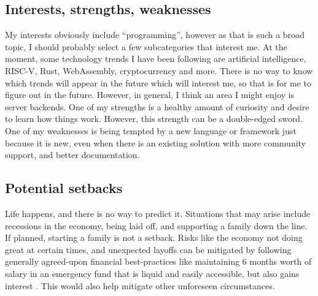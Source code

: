 \subsection{Interests, strengths, weaknesses}
My interests obviously include ``programming'', however as that is such a broad
topic, I should probably select a few subcategories that interest me.  At the
moment, some technology trends I have been following are artificial
intelligence, RISC-V, Rust, WebAssembly, cryptocurrency and more.  There is no
way to know which trends will appear in the future which will interest me, so
that is for me to figure out in the future. However, in general, I think an area
I might enjoy is server backends.  One of my strengths is a healthy amount of
curiosity and desire to learn how things work. However, this strength can be a
double-edged sword. One of my weaknesses is being tempted by a new language or
framework just because it is new, even when there is an existing solution with
more community support, and better documentation. 

\subsection{Potential setbacks}
Life happens, and there is no way to predict it. Situations that may arise
include recessions in the economy, being laid off, and supporting a family down
the line. If planned, starting a family is not a setback.
Risks like the economy not doing great at certain times, and
unexpected layoffs can be mitigated by following generally agreed-upon financial
best-practices like maintaining 6 months worth of salary in an emergency fund
that is liquid and easily accessible, but also gains interest 
\cite{r/personalfinancecanada}. This would also help mitigate other unforeseen
circumstances. 
